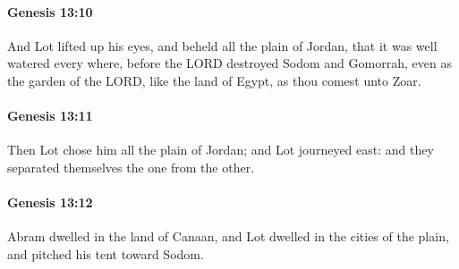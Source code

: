 		\paragraph{Genesis 13:10} %
			\label{GENESIS-13-10}

			And Lot lifted up his eyes, and beheld all the plain of Jordan, that it was well watered every where, before the LORD destroyed Sodom and Gomorrah, even as the garden of the LORD, like the land of Egypt, as thou comest unto Zoar.


		\paragraph{Genesis 13:11} %
			\label{GENESIS-13-11}

			Then Lot chose him all the plain of Jordan; and Lot journeyed east: and they separated themselves the one from the other.


		\paragraph{Genesis 13:12} %
			\label{GENESIS-13-12}

			Abram dwelled in the land of Canaan, and Lot dwelled in the cities of the plain, and pitched his tent toward Sodom.


